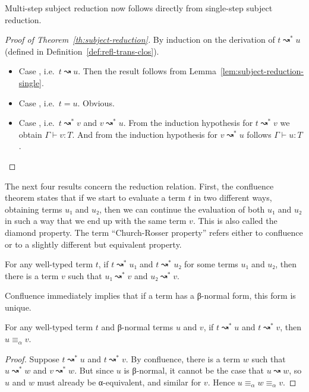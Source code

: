 \documentclass{article}
\theoremstyle{definition}
\newcommand{\lbl}[1]{\RightTirNameStyle{#1}}
\begin{document}
Multi-step subject reduction now follows directly from single-step subject reduction.

\begin{proof}[Proof of Theorem~\ref{th:subject-reduction}]
  By induction on the derivation of $t ↝^{*} u$ (defined in Definition~\ref{def:refl-trans-clos}).
  \begin{itemize}
    \item Case \lbl{Step}, i.e.\ $t ↝ u$.
          Then the result follows from Lemma~\ref{lem:subject-reduction-single}.
    \item Case \lbl{Refl}, i.e.\ $t = u$.
          Obvious.
    \item Case \lbl{Trans}, i.e.\ $t ↝^{*} v$ and $v ↝^{*} u$.
          From the induction hypothesis for $t ↝^{*} v$ we obtain $Γ ⊢ v : T$.
          And from the induction hypothesis for $v ↝^{*} u$ follows $Γ ⊢ u : T$.
  \end{itemize}
\end{proof}

The next four results concern the reduction relation.
First, the confluence theorem states that if we start to evaluate a term $t$ in two different ways, obtaining terms $u₁$ and $u₂$, then we can continue the evaluation of both $u₁$ and $u₂$ in such a way that we end up with the same term $v$.
This is also called the diamond property.
The term \enquote{Church-Rosser property} refers either to confluence or to a slightly different but equivalent property.

\begin{theorem}\label{th:confluence}
  For any well-typed term $t$, if $t ↝^{*} u₁$ and $t ↝^{*} u₂$ for some terms $u₁$ and $u₂$, then there is a term $v$ such that $u₁ ↝^{*} v$ and $u₂ ↝^{*} v$.
\end{theorem}

Confluence immediately implies that if a term has a β-normal form, this form is unique.

\begin{corollary}\label{th:nf-unique}
  For any well-typed term $t$ and β-normal terms $u$ and $v$, if $t ↝^{*} u$ and $t ↝^{*} v$, then $u ≡_{α} v$.
\end{corollary}

\begin{proof}
  Suppose $t ↝^{*} u$ and $t ↝^{*} v$.
  By confluence, there is a term $w$ such that $u ↝^{*} w$ and $v ↝^{*} w$.
  But since $u$ is β-normal, it cannot be the case that $u ↝ w$, so $u$ and $w$ must already be α-equivalent, and similar for $v$.
  Hence $u ≡_{α} w ≡_{α} v$.
\end{proof}
\end{document}
